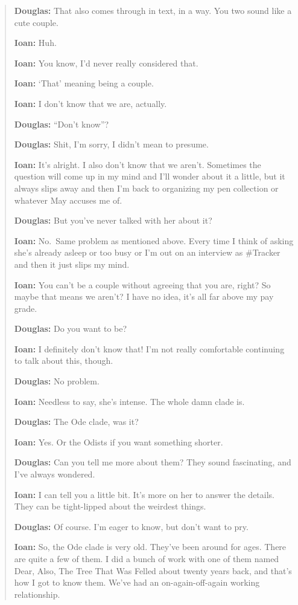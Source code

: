 \begin{quote}
\textbf{Douglas:} That also comes through in text, in a way. You two sound like a cute couple.

\textbf{Ioan:} Huh.

\textbf{Ioan:} You know, I'd never really considered that.

\textbf{Ioan:} `That' meaning being a couple.

\textbf{Ioan:} I don't know that we are, actually.

\textbf{Douglas:} ``Don't know''?

\textbf{Douglas:} Shit, I'm sorry, I didn't mean to presume.

\textbf{Ioan:} It's alright. I also don't know that we aren't. Sometimes the question will come up in my mind and I'll wonder about it a little, but it always slips away and then I'm back to organizing my pen collection or whatever May accuses me of.

\textbf{Douglas:} But you've never talked with her about it?

\textbf{Ioan:} No.~Same problem as mentioned above. Every time I think of asking she's already asleep or too busy or I'm out on an interview as \#Tracker and then it just slips my mind.

\textbf{Ioan:} You can't be a couple without agreeing that you are, right? So maybe that means we aren't? I have no idea, it's all far above my pay grade.

\textbf{Douglas:} Do you want to be?

\textbf{Ioan:} I definitely don't know that! I'm not really comfortable continuing to talk about this, though.

\textbf{Douglas:} No problem.

\textbf{Ioan:} Needless to say, she's intense. The whole damn clade is.

\textbf{Douglas:} The Ode clade, was it?

\textbf{Ioan:} Yes. Or the Odists if you want something shorter.

\textbf{Douglas:} Can you tell me more about them? They sound fascinating, and I've always wondered.

\textbf{Ioan:} I can tell you a little bit. It's more on her to answer the details. They can be tight-lipped about the weirdest things.

\textbf{Douglas:} Of course. I'm eager to know, but don't want to pry.

\textbf{Ioan:} So, the Ode clade is very old. They've been around for ages. There are quite a few of them. I did a bunch of work with one of them named Dear, Also, The Tree That Was Felled about twenty years back, and that's how I got to know them. We've had an on-again-off-again working relationship.


\end{quote}
